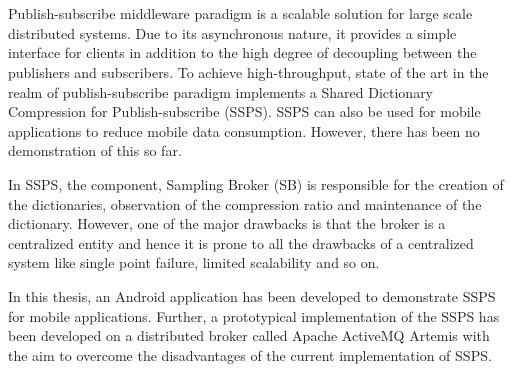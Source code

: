 \chapter{\abstractname}
\setlength{\parskip}{1em}
\setlength\parindent{0pt}

Publish-subscribe middleware paradigm is a scalable solution for large scale distributed systems. Due to its asynchronous nature, it provides a simple interface for clients in addition to the high degree of decoupling between the publishers and subscribers. To achieve high-throughput, state of the art in the realm of publish-subscribe paradigm implements a Shared Dictionary Compression for Publish-subscribe (SSPS). SSPS can also be used for mobile applications to reduce mobile data consumption. However, there has been no demonstration of this so far.

In SSPS, the component, Sampling Broker (SB) is responsible for the creation of the dictionaries, observation of the compression ratio and maintenance of the dictionary. However, one of the major drawbacks is that the broker is a centralized entity and hence it is prone to all the drawbacks of a centralized system like single point failure, limited scalability and so on.

In this thesis, an Android application has been developed to demonstrate SSPS for mobile applications. Further, a prototypical implementation of the SSPS has been developed on a distributed broker called Apache ActiveMQ Artemis with the aim to overcome the disadvantages of the current implementation of SSPS. 